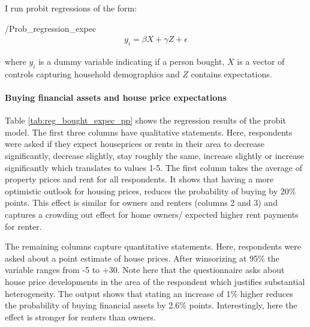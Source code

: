 \documentclass[ProjectABM]{subfiles}
\begin{document}
I run probit regressions of the form:
\begin{verbatimwrite}{\EqDir/Prob_regression_expec}
	\begin{align}
		y_i = \beta X + \gamma Z + \epsilon  \label{eq:Prob_reg_expec}
	\end{align}
\end{verbatimwrite}


%
where $y_i$ is a dummy variable indicating if a person bought, $X$ is a vector of controls capturing household demographics and $Z$ contains expectations.


\paragraph{Buying financial assets and house price expectations}
Table \ref{tab:reg_bought_expec_pp} shows the regression results of the probit model. The first three columns have qualitative statements. Here, respondents were asked if they expect houseprices or rents in their area to decrease significantly, decrease slightly, stay roughly the same, increase slightly or increase significantly which translates to values 1-5. The first column takes the average of property prices and rent for all respondents. It shows that having a more optimistic outlook for housing prices, reduces the probability of buying by 20\% points. This effect is similar for owners and renters (columns 2 and 3) and captures a crowding out effect for home owners/ expected higher rent payments for renter.

The remaining columns capture quantitative statements. Here, respondents were asked about a point estimate of house prices. After winsorizing at 95\% the variable ranges from -5 to +30. Note here that the questionnaire asks about house price developments in the area of the respondent which justifies substantial heterogeneity. The output shows that stating an increase of 1\% higher reduces the probability of buying financial assets by 2.6\% points. Interestingly, here the effect is stronger for renters than owners.
\end{document}
